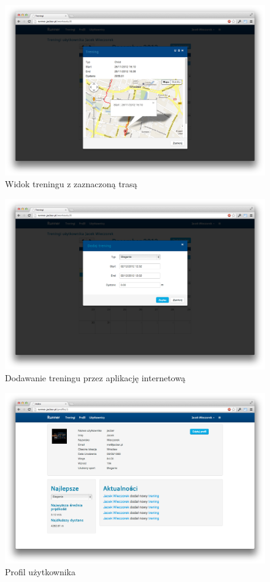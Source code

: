 \begin{figure}[ht]
	\centering
		\includegraphics[width=1\linewidth]{assets/workout_map.png}
	\caption{Widok treningu z zaznaczoną trasą}
	\label{fig:workout_map}
\end{figure}

\begin{figure}[ht]
	\centering
		\includegraphics[width=1\linewidth]{assets/add_workout2.png}
	\caption{Dodawanie treningu przez aplikację internetową}
	\label{fig:add_workout}
\end{figure}

\begin{figure}[ht]
	\centering
		\includegraphics[width=1\linewidth]{assets/profil.png}
	\caption{Profil użytkownika}
	\label{fig:add_workout}
\end{figure}

